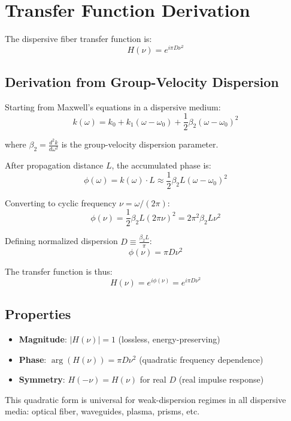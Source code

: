 
\section{Transfer Function Derivation}

The dispersive fiber transfer function is:
$$
    H(\nu) = e^{i \pi D \nu^{2}}
$$

\subsection{Derivation from Group-Velocity Dispersion}

Starting from Maxwell's equations in a dispersive medium:
$$
    k(\omega) = k_0 + k_1(\omega - \omega_0) + \frac{1}{2}\beta_2(\omega - \omega_0)^2
$$

where $\beta_2 = \frac{d^2 k}{d\omega^2}$ is the group-velocity dispersion parameter.

After propagation distance $L$, the accumulated phase is:
$$
    \phi(\omega) = k(\omega) \cdot L \approx \frac{1}{2}\beta_2 L (\omega - \omega_0)^2
$$

Converting to cyclic frequency $\nu = \omega/(2\pi)$:
$$
    \phi(\nu) = \frac{1}{2}\beta_2 L (2\pi\nu)^2 = 2\pi^2 \beta_2 L \nu^2
$$

Defining normalized dispersion $D \equiv \frac{\beta_2 L}{\pi}$:
$$
    \phi(\nu) = \pi D \nu^2
$$

The transfer function is thus:
$$
    H(\nu) = e^{i\phi(\nu)} = e^{i\pi D \nu^2}
$$

\subsection{Properties}

\begin{itemize}
    \item \textbf{Magnitude}: $|H(\nu)| = 1$ (lossless, energy-preserving)
    \item \textbf{Phase}: $\arg(H(\nu)) = \pi D \nu^2$ (quadratic frequency dependence)
    \item \textbf{Symmetry}: $H(-\nu) = H(\nu)$ for real $D$ (real impulse response)
\end{itemize}

This quadratic form is universal for weak-dispersion regimes in all dispersive media: 
optical fiber, waveguides, plasma, prisms, etc.
